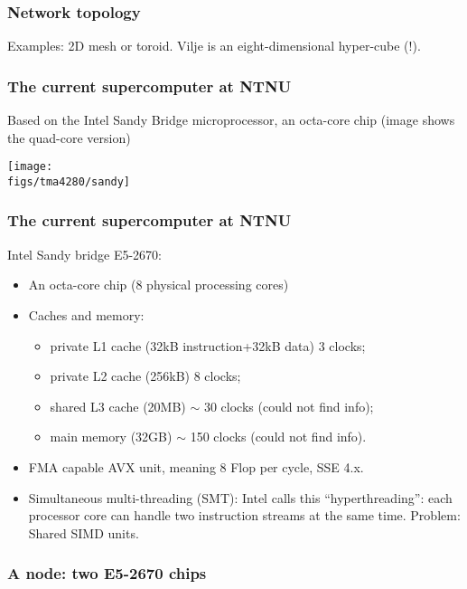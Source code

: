 \begin{frame}
  \frametitle{Network topology}
  Examples: 2D mesh or toroid. Vilje is an eight-dimensional hyper-cube (!).
  \begin{center}
    
    \qquad
    
  \end{center}
\end{frame}

\begin{frame}
  \frametitle{The current supercomputer at NTNU}
  Based on the Intel Sandy Bridge microprocessor, an octa-core chip (image
  shows the quad-core version)
  \begin{center}
    \texttt{[image: \\figs/tma4280/sandy]}
  \end{center}
\end{frame}

\begin{frame}
  \frametitle{The current supercomputer at NTNU}
  Intel Sandy bridge E5-2670:
  \begin{itemize}
  \item An octa-core chip (8 physical processing cores)
  \item Caches and memory:
    \begin{itemize}
    \item private L1 cache (32kB instruction+32kB data) 3 clocks;
    \item private L2 cache (256kB) 8 clocks;
    \item shared L3 cache (20MB) $\sim$ 30 clocks (could not find info);
    \item main memory (32GB) $\sim$ 150 clocks (could not find info).
    \end{itemize}
  \item FMA capable AVX unit, meaning 8 Flop per cycle, SSE 4.x.
  \item Simultaneous multi-threading (SMT): Intel calls this ``hyperthreading'':
    each processor core can handle two instruction streams at the same time.
    Problem: Shared SIMD units.
  \end{itemize}
\end{frame}

\begin{frame}
  \frametitle{A node: two E5-2670 chips}
  \begin{center}
  \end{center}
\end{frame}

